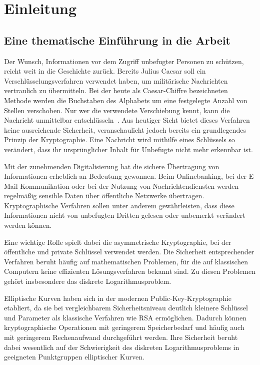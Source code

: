 \chapter{Einleitung}
\section{Eine thematische Einführung in die Arbeit}
Der Wunsch, Informationen vor dem Zugriff unbefugter Personen zu schützen, reicht weit in die Geschichte zurück. Bereits Julius Caesar soll ein Verschlüsselungsverfahren verwendet haben, um militärische Nachrichten vertraulich zu übermitteln. Bei der heute als Caesar-Chiffre bezeichneten Methode werden die Buchstaben des Alphabets um eine festgelegte Anzahl von Stellen verschoben. Nur wer die verwendete Verschiebung kennt, kann die Nachricht unmittelbar entschlüsseln~\cite[S.~14--15]{buell24}. Aus heutiger Sicht bietet dieses Verfahren keine ausreichende Sicherheit, veranschaulicht jedoch bereits ein grundlegendes Prinzip der Kryptographie. Eine Nachricht  wird mithilfe eines Schlüssels so verändert, dass ihr ursprünglicher Inhalt für Unbefugte nicht mehr erkennbar ist.

Mit der zunehmenden Digitalisierung hat die sichere Übertragung von Informationen erheblich an Bedeutung gewonnen. Beim Onlinebanking, bei der E-Mail-Kommunikation oder bei der Nutzung von Nachrichtendiensten werden regelmäßig sensible Daten über öffentliche Netzwerke übertragen. Kryptographische Verfahren sollen unter anderem gewährleisten, dass diese Informationen nicht von unbefugten Dritten gelesen oder unbemerkt verändert werden können.

Eine wichtige Rolle spielt dabei die asymmetrische Kryptographie, bei der öffentliche und private Schlüssel verwendet werden. Die Sicherheit entsprechender Verfahren beruht häufig auf mathematischen Problemen, für die
auf klassischen Computern keine effizienten Lösungsverfahren bekannt sind. Zu diesen Problemen gehört insbesondere das diskrete Logarithmusproblem.

Elliptische Kurven haben sich in der modernen Public-Key-Kryptographie
etabliert, da sie bei vergleichbarem Sicherheitsniveau deutlich kleinere
Schlüssel und Parameter als klassische Verfahren wie RSA ermöglichen.
Dadurch können kryptographische Operationen mit geringerem Speicherbedarf
und häufig auch mit geringerem Rechenaufwand durchgeführt werden. Ihre
Sicherheit beruht dabei wesentlich auf der Schwierigkeit des diskreten
Logarithmusproblems in geeigneten Punktgruppen elliptischer Kurven.

